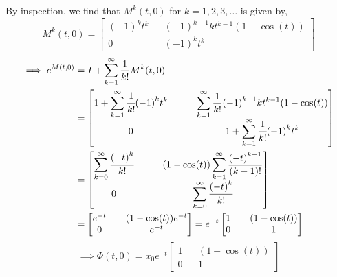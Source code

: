 By inspection, we find that \( M^{k} (t, 0) \) for \( k = 1, 2, 3, \ldots \) is given by,
\begin{equation*}
    M^{k} (t, 0)
    =
    \begin{bmatrix}
        {(-1)}^{k} t^{k}
         &  &
        {(-1)}^{k-1} k t^{k-1} (1 - \cos(t))
        \\
        0
         &  &
        {(-1)}^{k} t^{k}
    \end{bmatrix}
\end{equation*}
\begin{align*}
    \implies
    e^{M(t, 0)}
     & =
    I + \sum_{k=1}^{\infty} \frac{1}{k!} M^{k} (t, 0)
    \\ & =
    \begin{bmatrix}
        \displaystyle
        1 + \sum_{k=1}^{\infty} \cfrac{1}{k!} {(-1)}^{k} t^{k}
         &  &  &
        \displaystyle
        \sum_{k=1}^{\infty} \frac{1}{k!} {(-1)}^{k-1} k t^{k-1} (1 - \cos(t))
        \\
        0
         &  &  &
        \displaystyle
        1 + \sum_{k=1}^{\infty} \cfrac{1}{k!} {(-1)}^{k} t^{k}
    \end{bmatrix}
    \\ & =
    \begin{bmatrix}
        \displaystyle
        \sum_{k=0}^{\infty} \cfrac{{(-t)}^{k}}{k!}
         &  &  &
        \displaystyle
        (1 - \cos(t)) \sum_{k=1}^{\infty} \frac{{(-t)}^{k-1}}{(k-1)!}
        \\
        0
         &  &  &
        \displaystyle
        \sum_{k=0}^{\infty} \cfrac{{(-t)}^{k}}{k!}
    \end{bmatrix}
    \\ & =
    \begin{bmatrix}
        e^{-t}
         &  &
        (1 - \cos(t)) e^{-t}
        \\
        0
         &  &
        e^{-t}
    \end{bmatrix}
    =
    e^{-t}
    \begin{bmatrix}
        1
         &  &
        (1 - \cos(t))
        \\
        0
         &  &
        1
    \end{bmatrix}
\end{align*}
\begin{equation*}
    \implies
    \boxed{
        \Phi(t, 0)
        =
        x_0 e^{-t}
        \begin{bmatrix}
            1
             &  &
            (1 - \cos(t))
            \\
            0
             &  &
            1
        \end{bmatrix}
    }
\end{equation*}

